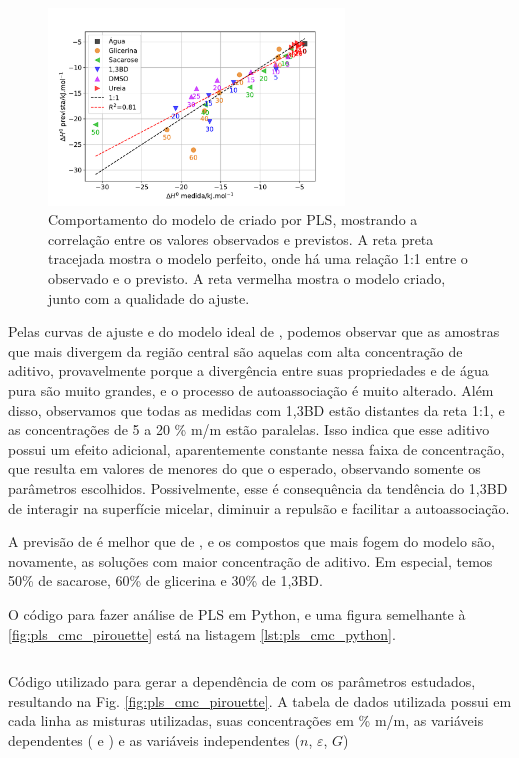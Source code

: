 		\begin{figure}[h]
			\centering
			\includegraphics[width=0.7\textwidth]{imagens/itc/PLS_dh_pirouette}
			\caption{Comportamento do modelo de \DHmic{} criado por PLS, mostrando a correlação entre os valores observados e previstos. A reta preta tracejada mostra o modelo perfeito, onde há uma relação 1:1 entre o observado e o previsto. A reta vermelha mostra o modelo criado, junto com a qualidade do ajuste.}
			\label{fig:pls_dh_pirouette}
		\end{figure} 
		
		Pelas curvas de ajuste e do modelo ideal de \cmc, podemos observar que as amostras que mais divergem da região central são aquelas com alta concentração de aditivo, provavelmente porque a divergência entre suas propriedades e de água pura são muito grandes, e o processo de autoassociação é muito alterado. Além disso, observamos que todas as medidas com 1,3BD estão distantes da reta 1:1, e as concentrações de 5 a 20 \% m/m estão paralelas. Isso indica que esse aditivo possui um efeito adicional, aparentemente constante nessa faixa de concentração, que resulta em valores de \cmc{} menores do que o esperado, observando somente os parâmetros escolhidos. Possivelmente, esse é consequência da tendência do 1,3BD de interagir na superfície micelar, diminuir a repulsão e facilitar a autoassociação.
		
		A previsão de \DHmic{} é melhor que de \cmc, e os compostos que mais fogem do modelo são, novamente, as soluções com maior concentração de aditivo. Em especial, temos 50\% de sacarose, 60\% de glicerina e 30\% de 1,3BD.
		
		O código para fazer análise de PLS em Python, e uma figura semelhante à \autoref{fig:pls_cmc_pirouette} está na listagem \ref{lst:pls_cmc_python}.
		
		\begin{listing}[h]
			\inputminted{python}{./python/pls_cmc_sklearn.py}
			\caption{Código utilizado para gerar a dependência de \cmc{} com os parâmetros estudados, resultando na Fig. \ref{fig:pls_cmc_pirouette}. A tabela de dados utilizada possui em cada linha as misturas utilizadas, suas concentrações em \% m/m, as variáveis dependentes (\cmc{} e \DHmic) e as variáveis independentes (\(n\), \(\varepsilon\), \(G\))}
			\label{lst:pls_cmc_python}
		\end{listing}
		
